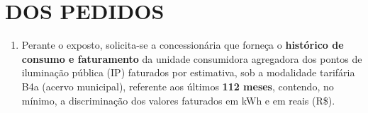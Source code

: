 \section{DOS PEDIDOS}

\begin{enumerate}[resume]
\item 
Perante o exposto, solicita-se a concessionária que forneça o \textbf{histórico de consumo e faturamento} da unidade consumidora agregadora dos pontos de iluminação pública (IP) faturados por estimativa, sob a modalidade tarifária B4a (acervo municipal), referente aos últimos \textbf{112 meses}, contendo, no mínimo, a discriminação dos valores faturados em kWh e em reais (R\$).
\end{enumerate}
